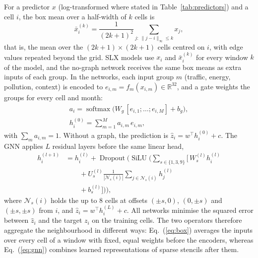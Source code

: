 \documentclass[pdflatex,sn-basic]{sn-jnl}
\begin{document}
For a predictor $x$ (log-transformed where stated in Table~\ref{tab:predictors}) and a cell $i$, the box mean over a half-width of $k$ cells is
\begin{equation}
\bar{x}_i^{(k)} = \frac{1}{(2k+1)^2} \sum_{j:\ \lVert j - i \rVert_\infty \le k} x_j , \label{eq:box}
\end{equation}
that is, the mean over the $(2k+1) \times (2k+1)$ cells centred on $i$, with edge values repeated beyond the grid. SLX models use $x_i$ and $\bar{x}_i^{(k)}$ for every window $k$ of the model, and the no-graph network receives the same box means as extra inputs of each group. In the networks, each input group $m$ (traffic, energy, pollution, context) is encoded to $e_{i,m} = f_m(x_{i,m}) \in \mathbb{R}^{32}$, and a gate weights the groups for every cell and month:
\begin{equation}
\begin{gathered}
a_i = \operatorname{softmax}\!\big(W_g\,[e_{i,1}; \dots ; e_{i,M}] + b_g\big), \\
h_i^{(0)} = \sum_{m=1}^{M} a_{i,m}\, e_{i,m},
\end{gathered} \label{eq:gate}
\end{equation}
with $\sum_m a_{i,m} = 1$. Without a graph, the prediction is $\hat{z}_i = w^{\top} h_i^{(0)} + c$. The GNN applies $L$ residual layers before the same linear head,
\begin{equation}
\begin{split}
h_i^{(l+1)} &= h_i^{(l)} + \operatorname{Dropout}\Big(\operatorname{SiLU}\Big(\sum_{s \in \{1,3,9\}} \big[\, W_s^{(l)} h_i^{(l)} \\
&\qquad + U_s^{(l)} \tfrac{1}{|\mathcal{N}_s(i)|} \sum_{j \in \mathcal{N}_s(i)} h_j^{(l)} \\
&\qquad + b_s^{(l)} \big]\Big)\Big),
\end{split} \label{eq:gnn}
\end{equation}
where $\mathcal{N}_s(i)$ holds the up to 8 cells at offsets $(\pm s, 0)$, $(0, \pm s)$ and $(\pm s, \pm s)$ from $i$, and $\hat{z}_i = w^{\top} h_i^{(L)} + c$. All networks minimise the squared error between $\hat{z}_i$ and the target $z_i$ on the training cells. The two operators therefore aggregate the neighbourhood in different ways: Eq.~(\ref{eq:box}) averages the inputs over every cell of a window with fixed, equal weights before the encoders, whereas Eq.~(\ref{eq:gnn}) combines learned representations of sparse stencils after them.
\end{document}
